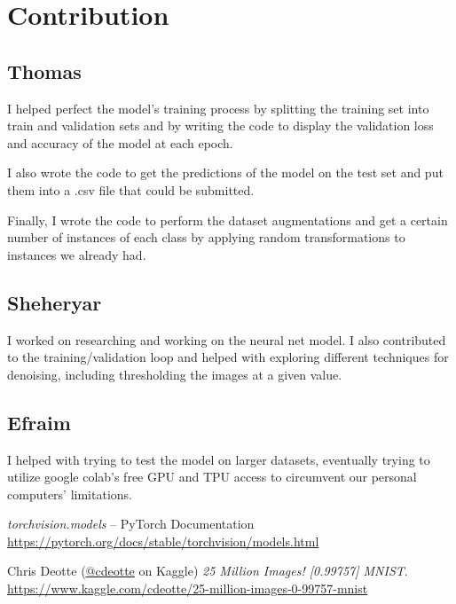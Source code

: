 \documentclass[12pt]{article}
\begin{document}
\section{Contribution}

\subsection{Thomas}
I helped perfect the model's training process by splitting the training set into train and validation sets and by writing the code to display the validation loss and accuracy of the model at each epoch.

I also wrote the code to get the predictions of the model on the test set and put them into a .csv file that could be submitted. 

Finally, I wrote the code to perform the dataset augmentations and get a certain number of instances of each class by applying random transformations to instances we already had.

\subsection{Sheheryar}
I worked on researching and working on the neural net model. I also
contributed to the training/validation loop and helped with exploring
different techniques for denoising, including thresholding the images at
a given value.

\subsection{Efraim}
I helped with trying to test the model on larger datasets, eventually trying to utilize google colab's free GPU and TPU access to circumvent our personal computers' limitations.    

\begin{thebibliography}{2}
  \textit{torchvision.models} -- PyTorch Documentation
  \\\url{https://pytorch.org/docs/stable/torchvision/models.html}

  Chris Deotte (\href{https://www.kaggle.com/cdeotte}{@cdeotte} on
  Kaggle)
  \textit{25 Million Images! [0.99757] MNIST}.
  \\\url{https://www.kaggle.com/cdeotte/25-million-images-0-99757-mnist}
\end{thebibliography}
\end{document}
